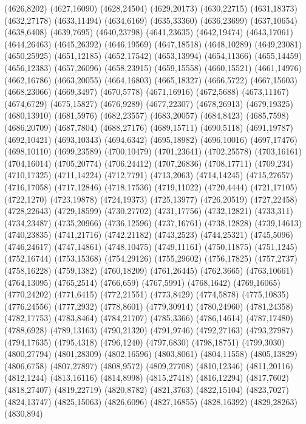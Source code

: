 (4626,8202)
(4627,16090)
(4628,24504)
(4629,20173)
(4630,22715)
(4631,18373)
(4632,27178)
(4633,11494)
(4634,6169)
(4635,33360)
(4636,23699)
(4637,10654)
(4638,6408)
(4639,7695)
(4640,23798)
(4641,23635)
(4642,19474)
(4643,17061)
(4644,26463)
(4645,26392)
(4646,19569)
(4647,18518)
(4648,10289)
(4649,23081)
(4650,25925)
(4651,12185)
(4652,17542)
(4653,13994)
(4654,11366)
(4655,14459)
(4656,12383)
(4657,26096)
(4658,23915)
(4659,15558)
(4660,15521)
(4661,14976)
(4662,16786)
(4663,20055)
(4664,16803)
(4665,18327)
(4666,5722)
(4667,15603)
(4668,23066)
(4669,3497)
(4670,5778)
(4671,16916)
(4672,5688)
(4673,11167)
(4674,6729)
(4675,15827)
(4676,9289)
(4677,22307)
(4678,26913)
(4679,19325)
(4680,13910)
(4681,5976)
(4682,23557)
(4683,20057)
(4684,8423)
(4685,7598)
(4686,20709)
(4687,7804)
(4688,27176)
(4689,15711)
(4690,5118)
(4691,19787)
(4692,10421)
(4693,10343)
(4694,6342)
(4695,18982)
(4696,10016)
(4697,17476)
(4698,10110)
(4699,23589)
(4700,10479)
(4701,23641)
(4702,25578)
(4703,16161)
(4704,16014)
(4705,20774)
(4706,24412)
(4707,26836)
(4708,17711)
(4709,234)
(4710,17325)
(4711,14224)
(4712,7791)
(4713,2063)
(4714,14245)
(4715,27657)
(4716,17058)
(4717,12846)
(4718,17536)
(4719,11022)
(4720,4444)
(4721,17105)
(4722,1270)
(4723,19878)
(4724,19373)
(4725,13977)
(4726,20519)
(4727,22458)
(4728,22643)
(4729,18599)
(4730,27702)
(4731,17756)
(4732,12821)
(4733,311)
(4734,23487)
(4735,20966)
(4736,12596)
(4737,16761)
(4738,12828)
(4739,14613)
(4740,23835)
(4741,21716)
(4742,21182)
(4743,2523)
(4744,25321)
(4745,5096)
(4746,24617)
(4747,14861)
(4748,10475)
(4749,11161)
(4750,11875)
(4751,1245)
(4752,16744)
(4753,15368)
(4754,29126)
(4755,29602)
(4756,17825)
(4757,2737)
(4758,16228)
(4759,1382)
(4760,18209)
(4761,26445)
(4762,3665)
(4763,10661)
(4764,13095)
(4765,2514)
(4766,659)
(4767,5991)
(4768,1642)
(4769,16065)
(4770,24202)
(4771,6415)
(4772,21551)
(4773,8429)
(4774,5878)
(4775,10835)
(4776,24556)
(4777,2932)
(4778,8601)
(4779,30914)
(4780,24960)
(4781,24358)
(4782,17753)
(4783,8464)
(4784,21707)
(4785,3366)
(4786,14614)
(4787,17480)
(4788,6928)
(4789,13163)
(4790,21320)
(4791,9746)
(4792,27163)
(4793,27987)
(4794,17635)
(4795,4318)
(4796,1240)
(4797,6830)
(4798,18751)
(4799,3030)
(4800,27794)
(4801,28309)
(4802,16596)
(4803,8061)
(4804,11558)
(4805,13829)
(4806,6758)
(4807,27897)
(4808,9572)
(4809,27708)
(4810,12346)
(4811,20116)
(4812,1244)
(4813,16116)
(4814,8998)
(4815,27418)
(4816,12294)
(4817,7602)
(4818,27407)
(4819,22719)
(4820,8782)
(4821,3763)
(4822,15104)
(4823,7027)
(4824,13747)
(4825,15063)
(4826,6096)
(4827,16855)
(4828,16392)
(4829,28263)
(4830,894)
